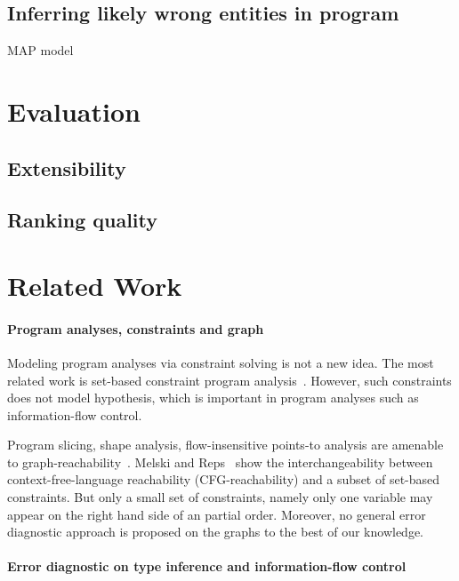 \subsection{Inferring likely wrong entities in program}

MAP model

\section{Evaluation}
\label{sec:evaluation}

\subsection{Extensibility}

\subsection{Ranking quality}

\section{Related Work}

\paragraph{Program analyses, constraints and graph} 

Modeling program analyses via constraint solving is not a new idea. The most
related work is set-based constraint program
analysis~\cite{aiken-setconstraint, aiken-typeinclusion}.  However, such
constraints does not model hypothesis, which is important in program analyses
such as information-flow control.
 
Program slicing, shape analysis, flow-insensitive points-to analysis are
amenable to graph-reachability~\cite{reps-graph}. Melski and
Reps~\cite{melski-cflgraph} show the interchangeability between
context-free-language reachability (CFG-reachability) and a subset of
set-based constraints. But only a small set of constraints, namely
only one variable may appear on the right hand side of an partial
order. Moreover, no general error diagnostic approach is proposed on
the graphs to the best of our knowledge. 

\paragraph{Error diagnostic on type inference and information-flow
control} 

